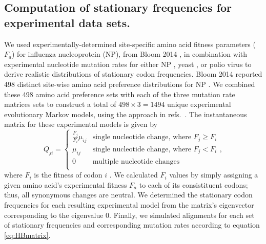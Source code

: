 \documentclass{pnastwo}
\begin{document}
\begin{article}
\subsection*{Computation of stationary frequencies for experimental data sets.}
We used experimentally-determined site-specific amino acid fitness parameters ($F_a$) for influenza nucleoprotein (NP), from Bloom 2014 \cite{Bloom2014a}, in combination with experimental nucleotide mutation rates for either NP \cite{Bloom2014a}, yeast \cite{Zhu2014}, or polio virus \cite{Acevedo2014} to derive realistic distributions of stationary codon frequencies. Bloom 2014 reported 498 distinct site-wise amino acid preference distributions for NP \cite{Bloom2014a}. We combined these 498 amino acid preference sets with each of the three mutation rate matrices sets to construct a total of $498 \times 3 = 1494$ unique experimental evolutionary Markov models, using the approach in refs.\ \cite{Bloom2014a,Bloom2014b}. The instantaneous matrix for these experimental models is given by 
\begin{equation}
Q_{ji} = \left\{ 
\begin{array}{rl}
  \frac{F_j}{F_i}\mu_{ij} &\mbox{single nucleotide change, where $F_j \geq F_i$} \\
  \mu_{ij}           &\mbox{single nucleotide change, where $F_j < F_i$}  \\ 
  0                  &\mbox{multiple nucleotide changes} \\        
\end{array} \right.,
\end{equation}
where $F_i$ is the fitness of codon $i$ \cite{Bloom2014a,Bloom2014b}. We calculated $F_i$ values by simply assigning a given amino acid's experimental fitness $F_a$ to each of its consistituent codons; thus, all synonymous changes are neutral. We determined the stationary codon frequencies for each resulting experimental model from the matrix's eigenvector corresponding to the eigenvalue 0. Finally, we simulated alignments for each set of stationary frequencies and corresponding mutation rates according to equation \eqref{eq:HBmatrix}.   

		

\end{article}
\end{document}

